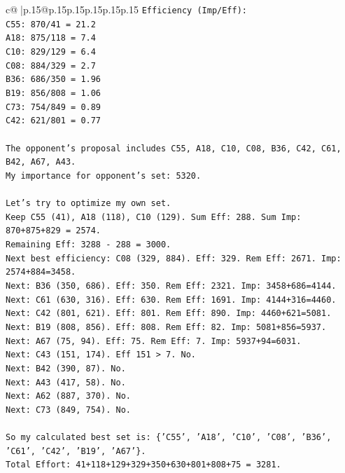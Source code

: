 \documentclass{article}
\begin{document}
{\begin{supertabular}{c@{$\;$}|p{.15\linewidth}@{}p{.15\linewidth}p{.15\linewidth}p{.15\linewidth}p{.15\linewidth}p{.15\linewidth}}
{{{\texttt{Efficiency (Imp/Eff):} \\
\texttt{C55: 870/41 = 21.2} \\
\texttt{A18: 875/118 = 7.4} \\
\texttt{C10: 829/129 = 6.4} \\
\texttt{C08: 884/329 = 2.7} \\
\texttt{B36: 686/350 = 1.96} \\
\texttt{B19: 856/808 = 1.06} \\
\texttt{C73: 754/849 = 0.89} \\
\texttt{C42: 621/801 = 0.77} \\
\\ 
\texttt{The opponent's proposal includes C55, A18, C10, C08, B36, C42, C61, B42, A67, A43.} \\
\texttt{My importance for opponent's set: 5320.} \\
\\ 
\texttt{Let's try to optimize my own set.} \\
\texttt{Keep C55 (41), A18 (118), C10 (129). Sum Eff: 288. Sum Imp: 870+875+829 = 2574.} \\
\texttt{Remaining Eff: 3288 {-} 288 = 3000.} \\
\texttt{Next best efficiency: C08 (329, 884). Eff: 329. Rem Eff: 2671. Imp: 2574+884=3458.} \\
\texttt{Next: B36 (350, 686). Eff: 350. Rem Eff: 2321. Imp: 3458+686=4144.} \\
\texttt{Next: C61 (630, 316). Eff: 630. Rem Eff: 1691. Imp: 4144+316=4460.} \\
\texttt{Next: C42 (801, 621). Eff: 801. Rem Eff: 890. Imp: 4460+621=5081.} \\
\texttt{Next: B19 (808, 856). Eff: 808. Rem Eff: 82. Imp: 5081+856=5937.} \\
\texttt{Next: A67 (75, 94). Eff: 75. Rem Eff: 7. Imp: 5937+94=6031.} \\
\texttt{Next: C43 (151, 174). Eff 151 > 7. No.} \\
\texttt{Next: B42 (390, 87). No.} \\
\texttt{Next: A43 (417, 58). No.} \\
\texttt{Next: A62 (887, 370). No.} \\
\texttt{Next: C73 (849, 754). No.} \\
\\ 
\texttt{So my calculated best set is: \{'C55', 'A18', 'C10', 'C08', 'B36', 'C61', 'C42', 'B19', 'A67'\}.} \\
\texttt{Total Effort: 41+118+129+329+350+630+801+808+75 = 3281.} \\
}}}
\end{supertabular}}
\end{document}
